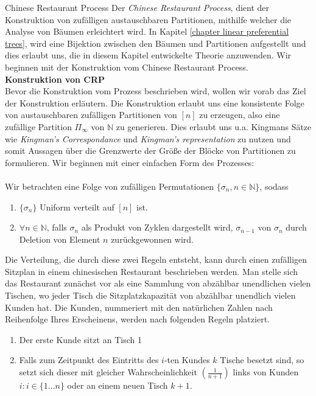 \begin{section}{Chinese Restaurant Process}
    Der \textit{Chinese Restaurant Process}, dient der Konstruktion von zufälligen austauschbaren Partitionen, mithilfe welcher die Analyse von Bäumen erleichtert wird. In Kapitel \ref{chapter linear preferential trees}, wird eine Bijektion zwischen den Bäumen und Partitionen aufgestellt und dies erlaubt uns, die in diesem Kapitel entwickelte Theorie anzuwenden. Wir beginnen mit der Konstruktion vom \glqq Chinese Restaurant Process\grqq.\\
\newline
\textbf{\fontsize{14}{18}\selectfont Konstruktion von CRP}
\\
Bevor die Konstruktion vom Prozess beschrieben wird, wollen wir vorab das Ziel der Konstruktion erläutern. Die Konstruktion erlaubt uns eine konsistente Folge von austauschbaren zufälligen Partitionen von $[n]$ zu erzeugen, also eine zufällige Partition $\Pi_\infty$ von $\mathbb{N}$ zu generieren. Dies erlaubt uns u.a. Kingmans Sätze wie \textit{Kingman's Correspondance} und \textit{Kingman's representation} zu nutzen und somit Aussagen über die Grenzwerte der Größe der Blöcke von Partitionen zu formulieren. Wir beginnen mit einer einfachen Form des Prozesses: \\
\\
Wir betrachten eine Folge von zufälligen Permutationen $ \{\sigma_n, n \in \mathbb{N}\}$, sodass 
\begin{enumerate}
    \item $ \{\sigma_n\}$ Uniform verteilt auf $[n]$ ist.
    \item $\forall n \in \mathbb{N}$, falls $\sigma_n$ als Produkt von Zyklen dargestellt wird, $\sigma_{n-1}$ von $\sigma_n$ durch Deletion von Element $n$ zurückgewonnen wird.  
\end{enumerate}
Die Verteilung, die durch diese zwei Regeln entsteht, kann durch einen zufälligen Sitzplan in einem chinesischen Restaurant beschrieben werden. Man stelle sich das Restaurant zunächst vor als eine Sammlung von abzählbar unendlichen vielen Tischen, wo jeder Tisch die Sitzplatzkapazität von abzählbar unendlich vielen Kunden hat. Die Kunden, nummeriert mit den natürlichen Zahlen nach Reihenfolge Ihres Erscheinens, werden nach folgenden Regeln platziert.
\begin{enumerate}
    \item Der erste Kunde sitzt an Tisch 1
    \item Falls zum Zeitpunkt des Eintritts des $i$-ten Kundes $k$ Tische besetzt sind, so setzt sich dieser mit gleicher Wahrscheinlichkeit $(\frac{1}{n+1})$ links von Kunden $i: i \in \{1...n\}$ oder an einem neuen Tisch $k+1$.

\end{enumerate}
\end{section}
